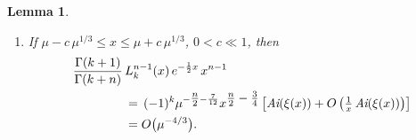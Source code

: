 \documentclass[11pt, reqno]{amsart}
\theoremstyle{plain}
\newtheorem{lemma}[theorem]{Lemma}
\theoremstyle{remark}
\theoremstyle{example}
\theoremstyle{definition}
\numberwithin{equation}{section}
\begin{document}
\begin{lemma}
\begin{enumerate}
\begin{enumerate}
\begin{equation}
        \begin{split}
            \frac{\Gamma(k+1)}{\Gamma(k+n)} \,   & L^{n-1}_{k}(x) \, e^{- \frac{1}{2} x} \,  x^{n-1} \\
            & = (-1)^k \mu^{- \frac{4}{3} } \mu^{\frac{1}{12}} (\mu - x)^{-\frac{1}{4}}   \left[  \cos \left( {  \textstyle\frac{2}{3} |\xi(x)|^{3/2}  - \frac{\pi}{4} }     \right) + O \left( { \textstyle  \mu^{  \frac{1}{6}} \left( 1 - \frac{x}{\mu}  \right)^{- \frac{1}{2}} } \right)  \right],
        \end{split}
    \end{equation} 
    Here, $\xi(x) :=  - \mu^{2/3} \phi({\textstyle \frac{x}{\mu}})$. Moreover,    $ \xi(x) \sim - \mu^{2/3} \left( 1 - {\textstyle \frac{x}{\mu}}  \right)$, if $a \mu \leq x \leq \mu$ and $ \xi(x) \sim  \mu^{2/3} \left(  {\textstyle \frac{x}{\mu}}  -1 \right)$, if $x > \mu$.
 \item [\emph{(\emph{b})}] \hspace*{.7mm} If $ \mu - c \, \mu^{1/3} \leq x \leq \mu + c \, \mu^{1/3}$, $0 < c \ll 1$, then
    \begin{equation} \label{around mu}
        \begin{split}
            \frac{\Gamma(k+1)}{\Gamma(k+n)} \,   & L^{n-1}_{k}(x) \, e^{- \frac{1}{2} x} \,  x^{n-1} \\
            & = \, (-1)^{k} \mu^{{-\textstyle\frac{n}{2}} - \frac{7}{12} }  x^{ {\textstyle\frac{n}{2} - \frac{3}{4}} } \left[ \emph{Ai}( \xi(x))   +  O \left( {\textstyle \frac{1}{x} } \, \emph{Ai}( \xi(x)) \right)  \right]\\
            &= O \big(  \mu^{{-4/3 }  } \big).
        \end{split}
    \end{equation}  
    

\end{enumerate}
\end{enumerate}
\end{lemma}
\end{document}
